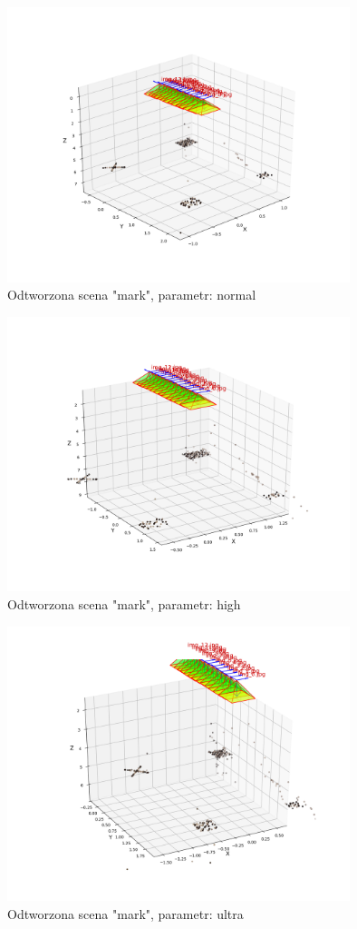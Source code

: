 \begin{figure}[h]
   \centering
   \includegraphics[width=10cm]{preset_mark/normal.png}
   \caption{Odtworzona scena "mark", parametr: normal}
   \label {fig:preset_mark_normal}
\end{figure}
\begin{figure}[h]
   \centering
   \includegraphics[width=10cm]{preset_mark/high.png}
   \caption{Odtworzona scena "mark", parametr: high}
   \label {fig:preset_mark_high}
\end{figure}
\begin{figure}[h]
   \centering
   \includegraphics[width=10cm]{preset_mark/ultra.png}
   \caption{Odtworzona scena "mark", parametr: ultra}
   \label {fig:preset_mark_ultra}
\end{figure}

